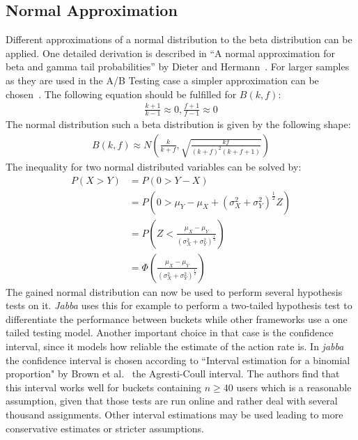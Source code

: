 \documentclass[../Thesis.tex]{subfiles}
\begin{document}
\subsection{Normal Approximation}\label{ssec:normal_approx}
Different approximations of a normal distribution to the beta distribution can be applied. One detailed derivation is described in ``A normal approximation for beta and gamma tail probabilities'' by Dieter and Hermann~\cite{alfers1984normal}. For larger samples as they are used in the A/B Testing case a simpler approximation can be chosen~\cite{epix}. The following equation should be fulfilled for $B(k,f)$:
\begin{align*}
\frac{k + 1}{k - 1}\approx 0,
\frac{f + 1}{f - 1}\approx 0
\end{align*}
The normal distribution such a beta distribution is given by the following shape:
\begin{align*}
B(k,f)\approx N\left(\frac{k}{k+f},\sqrt{\frac{kf}{(k+f)^2(k+f+1)}} \right)
\end{align*}
The inequality for two normal distributed variables can be solved by:
\begin{align*}
P(X>Y)	&= P(0 > Y - X) \\
			&= P(0 > \mu_Y - \mu_X + (\sigma_X^2 + \sigma_Y^2)^{\frac{1}{2}}Z) \\
			&= P\left(Z < \frac{\mu_X - \mu_Y}{\left(\sigma_X^2 + \sigma_Y^2\right)^{\frac{1}{2}}}\right) \\
			&= \Phi\left(\frac{\mu_X - \mu_Y}{\left(\sigma_X^2 + \sigma_Y^2\right)^{\frac{1}{2}}}\right)
\end{align*}
The gained normal distribution can now be used to perform several hypothesis tests on it. \emph{Jabba} uses this for example to perform a two-tailed hypothesis test to differentiate the performance between buckets while other frameworks use a one tailed testing model. Another important choice in that case is the confidence interval, since it models how reliable the estimate of the action rate is. In \emph{jabba} the confidence interval is chosen according to ``Interval estimation for a binomial proportion" by Brown et al.~\cite{brown2001interval} the Agresti-Coull interval. The authors find that this interval works well for buckets containing $n \geq 40$ users which is a reasonable assumption, given that those tests are run online and rather deal with several thousand assignments. Other interval estimations may be used leading to more conservative estimates or stricter assumptions.
\end{document}
